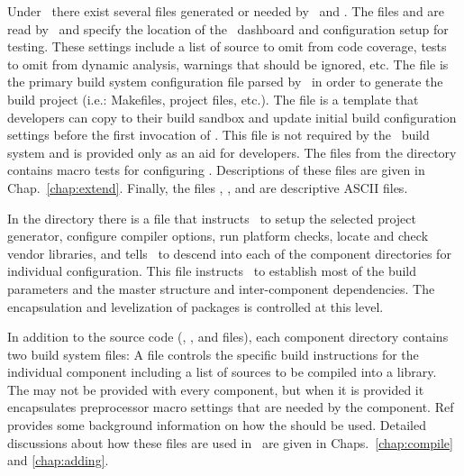 Under \draco\ there exist several files generated or needed by \cmake\ and \ctest.  The files   and   are read by \ctest\ and specify the location of the \draco\ dashboard and configuration setup for testing.  These settings include a list of source to omit from code coverage, tests to omit from dynamic analysis, warnings that should be ignored, etc.  The   file is the primary build system configuration file parsed by \cmake\ in order to generate the build project (i.e.: Makefiles, project files, etc.).  The   file is a template that developers can copy to their build sandbox and update initial build configuration settings before the first invocation of \cmake.  This file is not required by the \draco\ build system and is provided only as an aid for developers.
The  files from the  directory 
contains macro tests for configuring \draco.  Descriptions
of these files are given in Chap.~\ref{chap:extend}.  Finally, the
files , , and  are
descriptive ASCII files.

In the  directory there is a  file that
instructs \cmake\ to setup the selected project generator, configure compiler options, run platform checks, locate and check vendor libraries, and tells \cmake\ to descend into each of the component directories for individual configuration. This file instructs \cmake\ to establish most of the build parameters and the master structure and inter-component dependencies.  The encapsulation and levelization of packages is controlled at this level.

In addition to the source code (, , and 
files), each component directory contains two build system files: 
A  file controls the specific build instructions for the individual component including a list of sources to be compiled into a library.  The  may not be provided with every component, but when it is provided it encapsulates preprocessor macro settings that are needed by the component.  Ref~\cite{autoconf} provides some background information on how the  should be used.  Detailed discussions about how these files are used in \draco\ are given in Chaps.~\ref{chap:compile} and \ref{chap:adding}.


